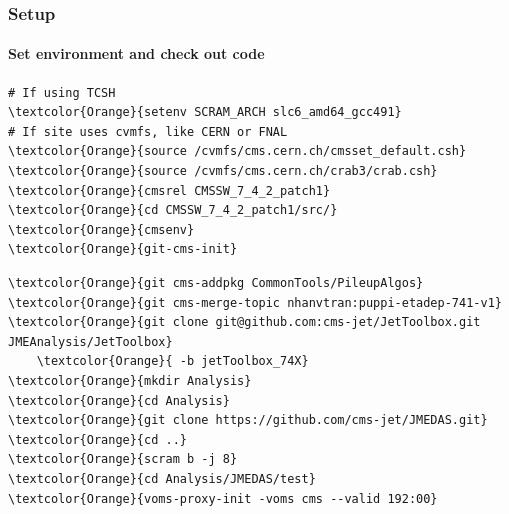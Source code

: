 
\begin{frame}[fragile]
	\frametitle{Setup}
	\framesubtitle{Set environment and check out code}

\begin{Verbatim}[label={Setup Commands}]
# If using TCSH
\textcolor{Orange}{setenv SCRAM_ARCH slc6_amd64_gcc491}
# If site uses cvmfs, like CERN or FNAL
\textcolor{Orange}{source /cvmfs/cms.cern.ch/cmsset_default.csh}
\textcolor{Orange}{source /cvmfs/cms.cern.ch/crab3/crab.csh}
\textcolor{Orange}{cmsrel CMSSW_7_4_2_patch1}
\textcolor{Orange}{cd CMSSW_7_4_2_patch1/src/}
\textcolor{Orange}{cmsenv}
\textcolor{Orange}{git-cms-init}
\end{Verbatim}

\begin{Verbatim}[label={Check out the code for the first exercise}]
\textcolor{Orange}{git cms-addpkg CommonTools/PileupAlgos}
\textcolor{Orange}{git cms-merge-topic nhanvtran:puppi-etadep-741-v1}
\textcolor{Orange}{git clone git@github.com:cms-jet/JetToolbox.git JMEAnalysis/JetToolbox}
	\textcolor{Orange}{ -b jetToolbox_74X}
\textcolor{Orange}{mkdir Analysis}
\textcolor{Orange}{cd Analysis}
\textcolor{Orange}{git clone https://github.com/cms-jet/JMEDAS.git}
\textcolor{Orange}{cd ..}
\textcolor{Orange}{scram b -j 8}
\textcolor{Orange}{cd Analysis/JMEDAS/test}
\textcolor{Orange}{voms-proxy-init -voms cms --valid 192:00}
\end{Verbatim}

\end{frame}

